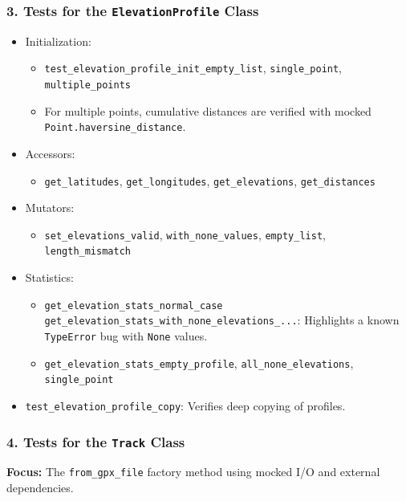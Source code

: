 \documentclass[12pt]{article}
\begin{document}
\subsubsection*{3. Tests for the \texttt{ElevationProfile} Class}
\begin{itemize}
  \item Initialization:
  \begin{itemize}
    \item \texttt{test\_elevation\_profile\_init\_empty\_list}, \texttt{single\_point}, \texttt{multiple\_points}
    \item For multiple points, cumulative distances are verified with mocked \texttt{Point.haversine\_distance}.
  \end{itemize}
  \item Accessors:
  \begin{itemize}
    \item \texttt{get\_latitudes}, \texttt{get\_longitudes}, \texttt{get\_elevations}, \texttt{get\_distances}
  \end{itemize}
  \item Mutators:
  \begin{itemize}
    \item \texttt{set\_elevations\_valid}, \texttt{with\_none\_values}, \texttt{empty\_list}, \texttt{length\_mismatch}
  \end{itemize}
  \item Statistics:
  \begin{itemize}
    \item \texttt{get\_elevation\_stats\_normal\_case}\newline
    \texttt{get\_elevation\_stats\_with\_none\_elevations\_...}: Highlights a known \texttt{TypeError} bug with \texttt{None} values.
    \item \texttt{get\_elevation\_stats\_empty\_profile}, \texttt{all\_none\_elevations}, \texttt{single\_point}
  \end{itemize}
  \item \texttt{test\_elevation\_profile\_copy}: Verifies deep copying of profiles.
\end{itemize}

\subsubsection*{4. Tests for the \texttt{Track} Class}
\textbf{Focus:} The \texttt{from\_gpx\_file} factory method using mocked I/O and external dependencies.
\end{document}
